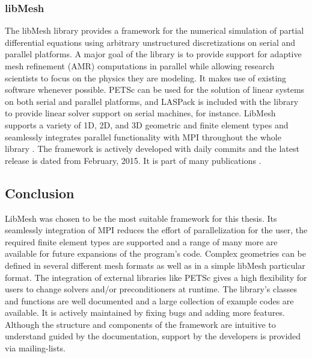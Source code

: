   
  
  
  \subsubsection{libMesh}
  The libMesh library provides a framework for the numerical simulation of partial differential equations using arbitrary unstructured discretizations on serial and parallel platforms. A major goal of the library is to provide support for adaptive mesh refinement (AMR) computations in parallel while allowing research scientists to focus on the physics they are modeling. It makes use of existing software whenever possible. PETSc can be used for the solution of linear systems on both serial and parallel platforms, and LASPack \cite{laspack2015url} is included with the library to provide linear solver support on serial machines, for instance. LibMesh supports a variety of 1D, 2D, and 3D geometric and finite element types and seamlessly integrates parallel functionality with MPI throughout the whole library \cite{kirk2006libmesh}. The framework is actively developed with daily commits and the latest release is dated from February, 2015. It is part of many publications \cite{libmeshPubs}.
  
  \subsection{Conclusion}
  LibMesh was chosen to be the most suitable framework for this thesis. Its seamlessly integration of MPI reduces the effort of parallelization for the user, the required finite element types are supported and a range of many more are available for future expansions of the program's code. Complex geometries can be defined in several different mesh formats as well as in a simple libMesh particular format. The integration of external libraries like PETSc gives a high flexibility for users to change solvers and/or preconditioners at runtime. The library's classes and functions are well documented and a large collection of example codes are available. It is actively maintained by fixing bugs and adding more features. Although the structure and components of the framework are intuitive to understand guided by the documentation, support by the developers is provided via mailing-lists.
  
